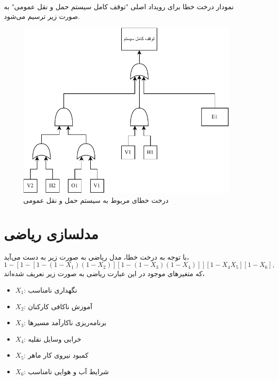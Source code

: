 نمودار درخت خطا برای رویداد اصلی "توقف کامل سیستم حمل و نقل عمومی" به صورت زیر ترسیم می‌شود.
\begin{figure}[!ht]
	\centering
	\includegraphics[width=0.5\linewidth]{fig/fig1.pdf}
	\caption{درخت خطای مربوط به سیستم حمل و نقل عمومی}
\end{figure}

\section{مدلسازی ریاضی}
با توجه به درخت خطا، مدل ریاضی به صورت زیر به دست می‌آید،
\begin{equation}
	1 - \left[1-\left[1-\left(1-X_1\right)\left(1-X_2\right)\right] \left[1-\left(1-X_3\right)\left(1-X_4\right)\right]\right] \left[1-X_4X_5\right] \left[1-X_6\right],
\end{equation}
که متغیرهای موجود در این عبارت ریاضی به صورت زیر نعریف شده‌اند،
\begin{itemize}
	\item $X_1$: نگهداری نامناسب
	\item $X_2$: آموزش ناکافی کارکنان
	\item $X_3$: برنامه‌ریزی ناکارآمد مسیرها
	\item $X_4$: خرابی وسایل نقلیه
	\item $X_5$: کمبود نیروی کار ماهر
	\item $X_6$: شرایط آب ‌و هوایی نامناسب
\end{itemize}